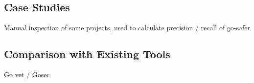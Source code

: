 



\subsection{Case Studies}\label{subsec:go-safer:evaluation:case-studies}

Manual inspection of some projects, used to calculate precision / recall of go-safer





\subsection{Comparison with Existing Tools}\label{subsec:go-safer:evaluation:linters-comparison}

Go vet / Gosec
